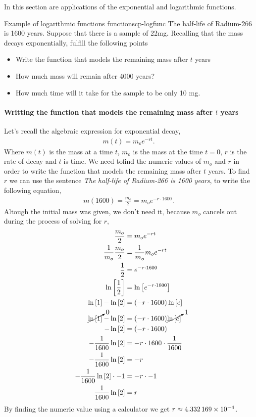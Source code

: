 \documentclass[../main.tex]{subfiles}
\begin{document}
In this section are applications of the exponential and logarithmic functions.

\begin{prob}{Example of logarithmic functions functions}{cp-logfunc}
The half-life of Radium-266 is 1600 years. Suppose that there is a sample of 22mg. Recalling that the mass decays exponentially, fulfill the following points 
\begin{itemize}
    \item Write the function that models the remaining mass after $t$ years 
    \item How much mass will remain after 4000 years? 
    \item How much time will it take for the sample to be only 10 mg.
\end{itemize}

\paragraph{Writting the function that models the remaining mass after $t$ years} Let's recall the algebraic expression for exponential decay,
\begin{gather*}
    m(t) = m_o e^{-rt}.
\end{gather*}
Where $m(t)$ is the mass at a time $t$, $m_o$ is the mass at the time $t=0$, $r$ is the rate of decay and $t$ is time.
We need tofind the numeric values of $m_o$ and $r$ in order to write the function that models the remaining mass after $t$ years.
To find $r$ we can use the sentence \textit{The half-life of Radium-266 is 1600 years}, to write the following equation,
\begin{gather*}
    m(1600) = \frac{m_o}{2} = m_o e^{-r\cdot1600}.
\end{gather*}
Altough the initial mass was given, we don't need it, because $m_o$ cancels out during the process of solving for $r$,
\begin{align*}
    \frac{m_o}{2} &= m_o e^{-rt} \\
    \frac{1}{m_o}\frac{m_o}{2} &= \frac{1}{m_o}m_o e^{-rt} \\
    \frac{1}{2} &= e^{-r\cdot1600} \\
    \ln\left[\frac{1}{2}\right] &= \ln\left[e^{-r\cdot1600}\right] \\
    \ln\left[1\right]-\ln\left[2\right] &= \qty(-r\cdot1600)\ln\left[e\right] \\
    \cancelto{0}{\ln\left[1\right]}-\ln\left[2\right] &= \qty(-r\cdot1600)\cancelto{1}{\ln\left[e\right]} \\
    -\ln\left[2\right] &= \qty(-r\cdot1600) \\
    -\frac{1}{1600}\ln\left[2\right] &= -r\cdot1600\cdot\frac{1}{1600} \\
    -\frac{1}{1600}\ln\left[2\right] &= -r \\
    -\frac{1}{1600}\ln\left[2\right]\cdot-1 &= -r\cdot-1 \\
    \frac{1}{1600}\ln\left[2\right] &= r
\end{align*}
By finding the numeric value using a calculator we get $r\approx\num{4.332169d-4}$.


\end{prob}
\end{document}
